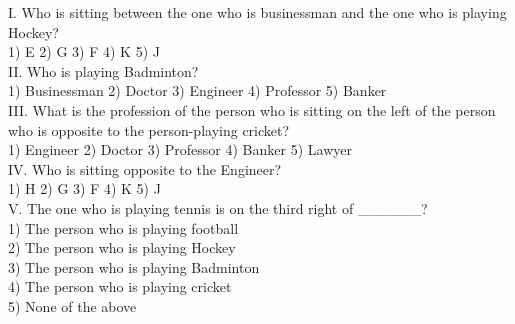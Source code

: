 \documentclass[
]{article}
\begin{document}
I. Who is sitting between the one who is businessman and the one who is playing
Hockey?\\
1) E \hspace{2mm}2) G \hspace{2mm}3) F \hspace{2mm}4) K \hspace{2mm}5) J\\

II. Who is playing Badminton?\\
1) Businessman \hspace{2mm}2) Doctor \hspace{2mm}3) Engineer
\hspace{2mm}4) Professor \hspace{2mm}5) Banker\\

III. What is the profession of the person who is sitting on the left of the person who is
opposite to the person-playing cricket?\\
1) Engineer \hspace{2mm}2) Doctor \hspace{2mm}3) Professor \hspace{2mm}4) Banker \hspace{2mm}5) Lawyer\\

IV. Who is sitting opposite to the Engineer?\\
1) H \hspace{2mm}2) G \hspace{2mm}3) F \hspace{2mm}4) K \hspace{2mm}5) J\\

V. The one who is playing tennis is on the third right of \_\_\_\_\_\_?\\
1) The person who is playing football\\
2) The person who is playing Hockey\\
3) The person who is playing Badminton\\
4) The person who is playing cricket\\
5) None of the above\\
\end{document}
